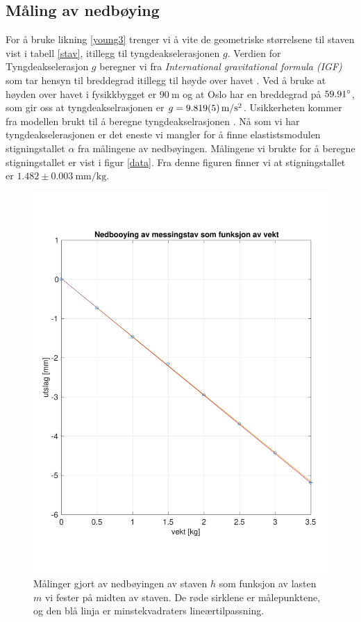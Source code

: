 \documentclass[%
 reprint,
 amsmath,amssymb,
 aps,
 norsk,
 booktabs
]{revtex4-1}
\begin{document}
\subsection{Måling av nedbøying}
For å bruke likning \eqref{young3} trenger vi å vite de geometriske størrelsene til staven vist i tabell \vref{stav}, itillegg til tyngdeakselerasjonen $g$. Verdien for Tyngdeakselerasjon $g$ beregner vi fra \textit{International gravitational formula (IGF)} som tar hensyn til breddegrad itillegg til høyde over havet \cite{gravity}. Ved å bruke at høyden over havet i fysikkbygget er $\SI{90}{\meter}$ og at Oslo har en breddegrad på $59.91\degree$, som gir oss at tyngdeakselrasjonen er $g=\SI{9.819\pm0.005}{\meter\per\second^2}$. Usikkerheten kommer fra modellen brukt til å beregne tyngdeakselrasjonen \cite{gravity}.
Nå som vi har tyngdeakselerasjonen er det eneste vi mangler for å finne elastistsmodulen stigningstallet $\alpha$ fra målingene av nedbøyingen. Målingene vi brukte for å beregne stigningstallet er vist i figur \vref{data}. Fra denne figuren finner vi at stigningstallet er $1.482\pm\SI{0.003}{\milli\meter\per\kilo\gram}$.
\begin{figure}[h!]
  \centering
  \includegraphics[scale=0.4]{nedbojing.pdf}
  \caption{Målinger gjort av nedbøyingen av staven $h$ som funksjon av lasten $m$ vi fester på midten av staven. De røde sirklene er målepunktene, og den blå linja er minstekvadraters lineærtilpassning.}
  \label{data}
\end{figure}
\end{document}
